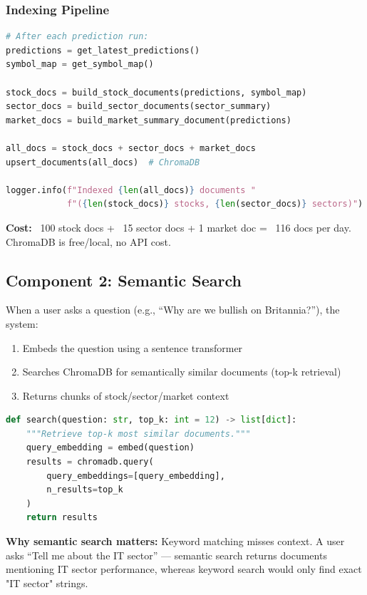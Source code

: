 \documentclass[11pt,a4paper]{article}
\begin{document}
\subsubsection{Indexing Pipeline}

\begin{lstlisting}[language=Python, caption=Daily Indexing Flow]
# After each prediction run:
predictions = get_latest_predictions()
symbol_map = get_symbol_map()

stock_docs = build_stock_documents(predictions, symbol_map)
sector_docs = build_sector_documents(sector_summary)
market_docs = build_market_summary_document(predictions)

all_docs = stock_docs + sector_docs + market_docs
upsert_documents(all_docs)  # ChromaDB

logger.info(f"Indexed {len(all_docs)} documents "
            f"({len(stock_docs)} stocks, {len(sector_docs)} sectors)")
\end{lstlisting}

\textbf{Cost:} ~100 stock docs + ~15 sector docs + 1 market doc = ~116 docs per day. ChromaDB is free/local, no API cost.

\subsection{Component 2: Semantic Search}

When a user asks a question (e.g., ``Why are we bullish on Britannia?''), the system:

\begin{enumerate}
    \item Embeds the question using a sentence transformer
    \item Searches ChromaDB for semantically similar documents (top-k retrieval)
    \item Returns chunks of stock/sector/market context
\end{enumerate}

\begin{lstlisting}[language=Python, caption=Semantic Retrieval Example]
def search(question: str, top_k: int = 12) -> list[dict]:
    """Retrieve top-k most similar documents."""
    query_embedding = embed(question)
    results = chromadb.query(
        query_embeddings=[query_embedding],
        n_results=top_k
    )
    return results
\end{lstlisting}

\textbf{Why semantic search matters:} Keyword matching misses context. A user asks ``Tell me about the IT sector'' — semantic search returns documents mentioning IT sector performance, whereas keyword search would only find exact "IT sector" strings.
\end{document}
